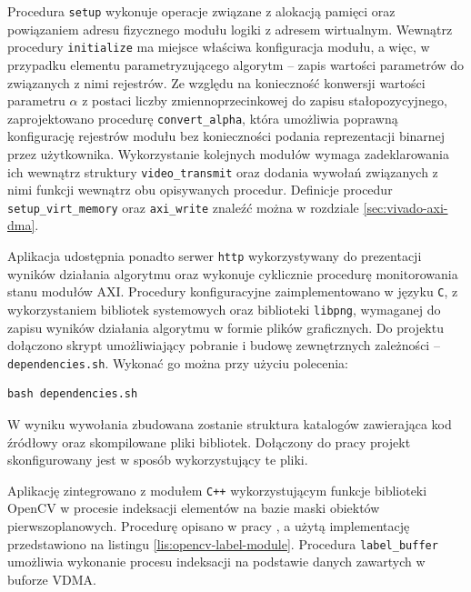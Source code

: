 Procedura \texttt{setup} wykonuje operacje związane z alokacją pamięci oraz powiązaniem adresu fizycznego modułu logiki z adresem wirtualnym.
Wewnątrz procedury \texttt{initialize} ma miejsce właściwa konfiguracja modułu, a więc, w przypadku elementu parametryzującego algorytm -- zapis wartości parametrów do związanych z nimi rejestrów. 
Ze względu na konieczność konwersji wartości parametru $\alpha$ z postaci liczby zmiennoprzecinkowej do zapisu stałopozycyjnego, zaprojektowano procedurę \texttt{convert\_alpha}, która umożliwia poprawną konfigurację rejestrów modułu bez konieczności podania reprezentacji binarnej przez użytkownika. %
Wykorzystanie kolejnych modułów wymaga zadeklarowania ich wewnątrz struktury \texttt{video\_transmit} oraz dodania wywołań związanych z nimi funkcji wewnątrz obu opisywanych procedur.
Definicje procedur \texttt{setup\_virt\_memory} oraz \texttt{axi\_write} znaleźć można w rozdziale \ref{sec:vivado-axi-dma}.

Aplikacja udostępnia ponadto serwer \texttt{http} wykorzystywany do prezentacji wyników działania algorytmu oraz wykonuje cyklicznie procedurę monitorowania stanu modułów AXI.
Procedury konfiguracyjne zaimplementowano w języku \texttt{C}, z wykorzystaniem bibliotek systemowych oraz biblioteki \texttt{libpng}, wymaganej do zapisu wyników działania algorytmu w formie plików graficznych.
Do projektu dołączono skrypt umożliwiający pobranie i budowę zewnętrznych zależności -- \texttt{dependencies.sh}. 
Wykonać go można przy użyciu polecenia:

\begin{lstlisting}
bash dependencies.sh
\end{lstlisting}
W wyniku wywołania zbudowana zostanie struktura katalogów zawierająca kod źródłowy oraz skompilowane pliki bibliotek. 
Dołączony do pracy projekt skonfigurowany jest w sposób wykorzystujący te pliki.

Aplikację zintegrowano z modułem \texttt{C++} wykorzystującym funkcje biblioteki OpenCV w procesie indeksacji elementów na bazie maski obiektów pierwszoplanowych. 
Procedurę opisano w pracy \cite{Bradski2016}, a użytą implementację przedstawiono na listingu \ref{lis:opencv-label-module}.
Procedura \texttt{label\_buffer} umożliwia wykonanie procesu indeksacji na podstawie danych zawartych w buforze VDMA.

